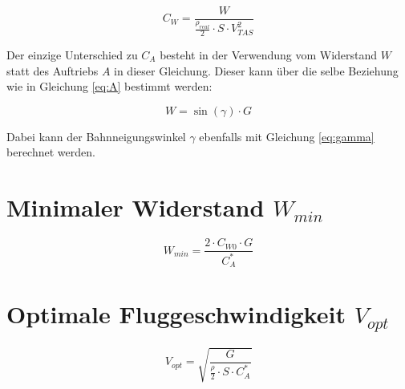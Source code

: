 \begin{equation}
C_W=\frac{W}{\frac{\rho_{real}}{2} \cdot S \cdot V_{TAS}^2}
\end{equation}

Der einzige Unterschied zu $C_A$ besteht in der Verwendung vom Widerstand $W$ statt des Auftriebs $A$ in dieser Gleichung. Dieser kann über die selbe Beziehung wie in Gleichung \ref{eq:A} bestimmt werden:

\begin{equation}
W=\sin(\gamma) \cdot G
\end{equation}

Dabei kann der Bahnneigungswinkel $\gamma$ ebenfalls mit Gleichung \ref{eq:gamma} berechnet werden.

\section{Minimaler Widerstand $W_{min}$}

\begin{equation}
W_{min}=\frac{2 \cdot C_{W0} \cdot G}{C_A^*}
\label{eq:W_min}
\end{equation}

\section{Optimale Fluggeschwindigkeit $V_{opt}$}

\begin{equation}
V_{opt}=\sqrt{\frac{G}{\frac{\rho}{2} \cdot S \cdot C_A^*}}
\label{eq:V_opt}
\end{equation}




